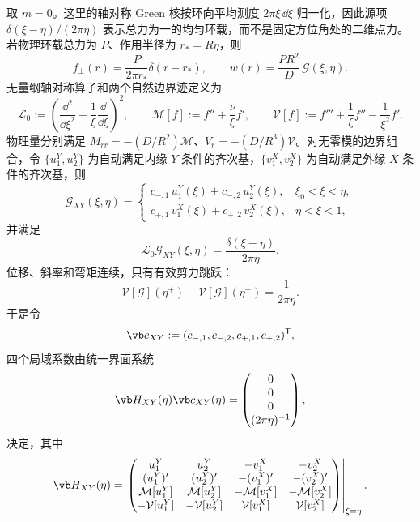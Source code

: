 取 \(m=0\)。这里的轴对称 Green 核按环向平均测度 \(2\pi\xi\,\dd\xi\) 归一化，因此源项 \(\delta(\xi-\eta)/(2\pi\eta)\) 表示总力为一的均匀环载，而不是固定方位角处的二维点力。若物理环载总力为 \(P\)、作用半径为 \(r_*=R\eta\)，则
\[
 f_\perp(r)=\frac{P}{2\pi r_*}\delta(r-r_*),
 \qquad
 w(r)=\frac{PR^2}{D}\,\mathcal G(\xi,\eta).
\]
无量纲轴对称算子和两个自然边界迹定义为
\[
 \mathcal L_0
 :=\left(\frac{\dd^2}{\dd\xi^2}
 +\frac1\xi\frac{\dd}{\dd\xi}\right)^2,
 \qquad
 \mathcal M[f]:=f''+\frac{\nu}{\xi}f',
 \qquad
 \mathcal V[f]:=f'''+\frac1\xi f''-\frac1{\xi^2}f'.
\]
物理量分别满足 \(M_{rr}=-(D/R^2)\mathcal M\)、\(V_r=-(D/R^3)\mathcal V\)。对无零模的边界组合，令 \(\{u_1^Y,u_2^Y\}\) 为自动满足内缘 \(Y\) 条件的齐次基，\(\{v_1^X,v_2^X\}\) 为自动满足外缘 \(X\) 条件的齐次基，则
\begin{equation}
 \mathcal G_{XY}(\xi,\eta)=
 \begin{cases}
  c_{-,1}\,u_1^Y(\xi)+c_{-,2}\,u_2^Y(\xi), & \xi_0<\xi<\eta,\\[2pt]
  c_{+,1}\,v_1^X(\xi)+c_{+,2}\,v_2^X(\xi), & \eta<\xi<1,
 \end{cases}
 \label{eq:phys-sm-axisym-green-piecewise}
\end{equation}
并满足
\[
 \mathcal L_0\mathcal G_{XY}(\xi,\eta)
 =\frac{\delta(\xi-\eta)}{2\pi\eta}.
\]
位移、斜率和弯矩连续，只有有效剪力跳跃：
\begin{equation}
 \mathcal V[\mathcal G](\eta^+)
 -\mathcal V[\mathcal G](\eta^-)
 =\frac{1}{2\pi\eta}.
 \label{eq:phys-sm-axisym-green-jump}
\end{equation}
于是令
\[
 \vb c_{XY}:=(c_{-,1},c_{-,2},c_{+,1},c_{+,2})^{\mathsf T},
\]
四个局域系数由统一界面系统
\begin{equation}
 \vb H_{XY}(\eta)\vb c_{XY}(\eta)
 =\begin{pmatrix}0\\0\\0\\(2\pi\eta)^{-1}\end{pmatrix},
 \label{eq:phys-sm-green-interface-system}
\end{equation}
决定，其中
\begin{equation}
\vb H_{XY}(\eta)=
\left.
\begin{pmatrix}
 u_1^Y & u_2^Y & -v_1^X & -v_2^X\\
 (u_1^Y)' & (u_2^Y)' & -(v_1^X)' & -(v_2^X)'\\
 \mathcal M[u_1^Y] & \mathcal M[u_2^Y] & -\mathcal M[v_1^X] & -\mathcal M[v_2^X]\\
 -\mathcal V[u_1^Y] & -\mathcal V[u_2^Y] & \mathcal V[v_1^X] & \mathcal V[v_2^X]
\end{pmatrix}
\right|_{\xi=\eta}.
\label{eq:phys-sm-green-interface-matrix}
\end{equation}
